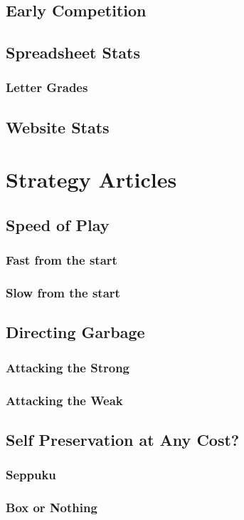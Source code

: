 \documentclass[a4paper,twoside,titlepage]{book}
\begin{document}
    \chapter{Early Competition}
    \chapter{Spreadsheet Stats}
      \section{Letter Grades}
    \chapter{Website Stats}
  \part{Strategy Articles}
    \chapter{Speed of Play}
      \section{Fast from the start}
      \section{Slow from the start}
    \chapter{Directing Garbage}
      \section{Attacking the Strong}
      \section{Attacking the Weak}
    \chapter{Self Preservation at Any Cost?}
      \section{Seppuku}
      \section{Box or Nothing}
\end{document}
